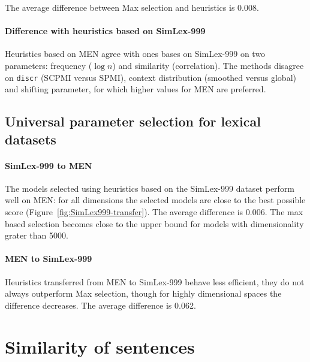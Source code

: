 The average difference between Max selection and heuristics is 0.008.

\paragraph{Difference with heuristics based on SimLex-999}

Heuristics based on MEN agree with ones bases on SimLex-999 on two parameters: frequency ($\log n$) and similarity (correlation). The methods disagree on \texttt{discr} (SCPMI versus SPMI), context distribution (smoothed versus global) and shifting parameter, for which higher values for MEN are preferred.

\subsection{Universal parameter selection for lexical datasets}
\label{sec:Universal-lexical-param-selection}

\paragraph{SimLex-999 to MEN}



The models selected using heuristics based on the SimLex-999 dataset perform well on MEN: for all dimensions the selected models are close to the best possible score (Figure~\ref{fig:SimLex999-transfer}). The average difference is 0.006. The max based selection becomes close to the upper bound for models with dimensionality grater than 5000.

\paragraph{MEN to SimLex-999}

Heuristics transferred from MEN to SimLex-999 behave less efficient, they do not always outperform Max selection, though for highly dimensional spaces the difference decreases. The average difference is 0.062.



\section{Similarity of sentences}
\label{sec:sentential}


